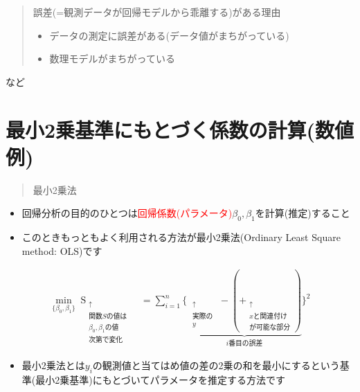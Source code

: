\documentclass[
]{book}
\providecommand{\tightlist}{%
  \setlength{\itemsep}{0pt}\setlength{\parskip}{0pt}}
\theoremstyle{definition}
\theoremstyle{definition}
\theoremstyle{definition}
\theoremstyle{definition}
\theoremstyle{remark}
\begin{document}
\begin{quote}
誤差(=観測データが回帰モデルから乖離する)がある理由

\begin{itemize}
\tightlist
\item
  データの測定に誤差がある(データ値がまちがっている)
\item
  数理モデルがまちがっている
\end{itemize}
\end{quote}

など

\hypertarget{ux6700ux5c0f2ux4e57ux57faux6e96ux306bux3082ux3068ux3065ux304fux4fc2ux6570ux306eux8a08ux7b97ux6570ux5024ux4f8b}{%
\section{最小2乗基準にもとづく係数の計算(数値例)}\label{ux6700ux5c0f2ux4e57ux57faux6e96ux306bux3082ux3068ux3065ux304fux4fc2ux6570ux306eux8a08ux7b97ux6570ux5024ux4f8b}}

\begin{quote}
最小2乗法
\end{quote}

\begin{itemize}
\tightlist
\item
  回帰分析の目的のひとつは\textcolor{red}{回帰係数(パラメータ)}\(\beta_0,\beta_1\)を計算(推定)すること
\item
  このときもっともよく利用される方法が最小2乗法(Ordinary Least Square method: OLS)です
\end{itemize}

\begin{align*}
\mathop{\min}_{\{\beta_0,\beta_1\}} 
\mathop{S(\beta_0,\beta_1)}_{\substack{\uparrow \\ \text{関数}S\text{の値は} \\ \beta_0,\beta_1\text{の値} \\ \text{次第で変化}}}
&=\sum_{i=1}^n \{ 
\underbrace{
\mathop{y_i}_{\substack{\uparrow \\ \text{実際の} \\ y}}
-(\mathop{\beta_0+\beta_1 x_i}_{\substack{\uparrow \\ x\text{と関連付け} \\ \text{が可能な部分}}}) 
}_{i\text{番目の誤差}}
\}^2 
\end{align*}

\begin{itemize}
\tightlist
\item
  最小2乗法とは\(y_i\)の観測値と当てはめ値の差の2乗の和を最小にするという基準(最小2乗基準)にもとづいてパラメータを推定する方法です
\end{itemize}
\end{document}
